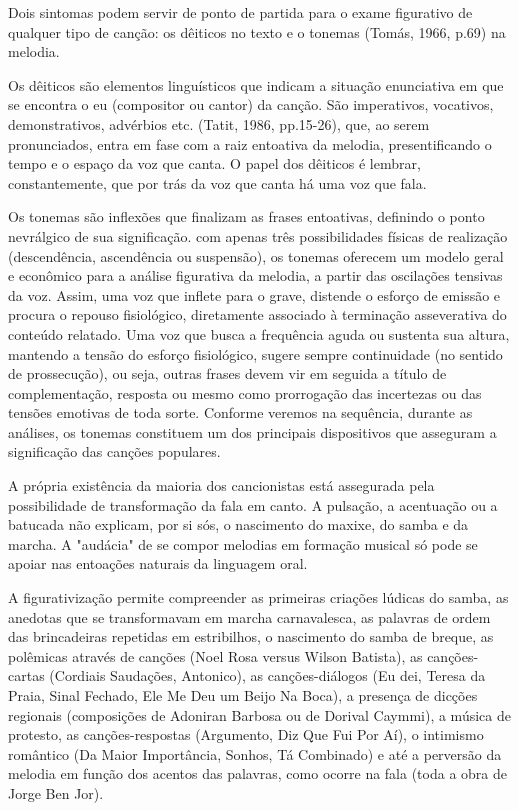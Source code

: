 Dois sintomas podem servir de ponto de partida para o exame figurativo
de qualquer tipo de canção: os dêiticos no texto e o tonemas (Tomás,
1966, p.69) na melodia.~

Os dêiticos são elementos linguísticos que indicam a situação
enunciativa em que se encontra o eu (compositor ou cantor) da canção.
São imperativos, vocativos, demonstrativos, advérbios etc. (Tatit, 1986,
pp.15-26), que, ao serem pronunciados, entra em fase com a raiz
entoativa da melodia, presentificando o tempo e o espaço da voz que
canta. O papel dos dêiticos é lembrar, constantemente, que por trás da
voz que canta há uma voz que fala.

Os tonemas são inflexões que finalizam as frases entoativas, definindo o
ponto nevrálgico de sua significação. com apenas três possibilidades
físicas de realização (descendência, ascendência ou suspensão), os
tonemas oferecem um modelo geral e econômico para a análise figurativa
da melodia, a partir das oscilações tensivas da voz. Assim, uma voz que
inflete para o grave, distende o esforço de emissão e procura o repouso
fisiológico, diretamente associado à terminação asseverativa do conteúdo
relatado. Uma voz que busca a frequência aguda ou sustenta sua altura,
mantendo a tensão do esforço fisiológico, sugere sempre continuidade (no
sentido de prossecução), ou seja, outras frases devem vir em seguida a
título de complementação, resposta ou mesmo como prorrogação das
incertezas ou das tensões emotivas de toda sorte. Conforme veremos na
sequência, durante as análises, os tonemas constituem um dos principais
dispositivos que asseguram a significação das canções populares.

A própria existência da maioria dos cancionistas está assegurada pela
possibilidade de transformação da fala em canto. A pulsação, a
acentuação ou a batucada não explicam, por si sós, o nascimento do
maxixe, do samba e da marcha. A "audácia" de se compor melodias em
formação musical só pode se apoiar nas entoações naturais da linguagem
oral.

A figurativização permite compreender as primeiras criações lúdicas do
samba, as anedotas que se transformavam em marcha carnavalesca, as
palavras de ordem das brincadeiras repetidas em estribilhos, o
nascimento do samba de breque, as polêmicas através de canções (Noel
Rosa versus Wilson Batista), as canções-cartas (Cordiais Saudações,
Antonico), as canções-diálogos (Eu dei, Teresa da Praia, Sinal Fechado,
Ele Me Deu um Beijo Na Boca), a presença de dicções regionais
(composições de Adoniran Barbosa ou de Dorival Caymmi), a música de
protesto, as canções-respostas (Argumento, Diz Que Fui Por Aí), o
intimismo romântico (Da Maior Importância, Sonhos, Tá Combinado) e até a
perversão da melodia em função dos acentos das palavras, como ocorre na
fala (toda a obra de Jorge Ben Jor).~

